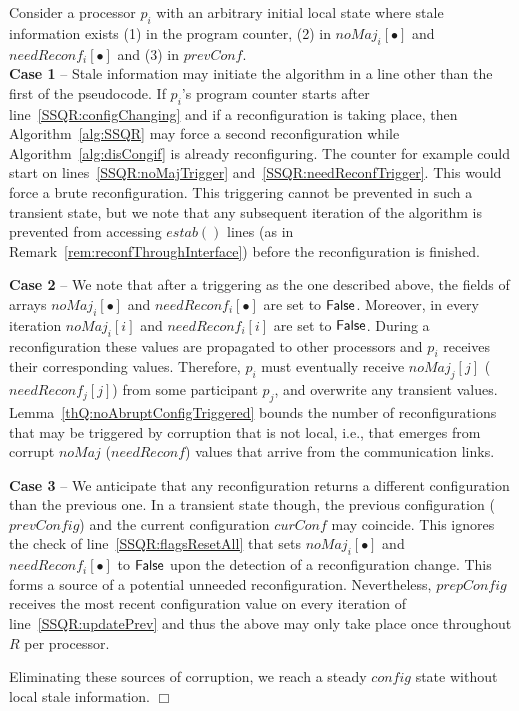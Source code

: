 \documentclass[11pt]{article}
\newcommand{\configEstab}{estab}
\newenvironment{proof}{\noindent{\bf Proof.}}{\hfill$\Box$}
\begin{document}
\begin{proof}
Consider a processor $p_i$ with an arbitrary initial local state where stale information exists  (1) in the program counter, (2) in $noMaj_i[\bullet]$ and $needReconf_i[\bullet]$ and (3) in $prevConf$. \\
\textbf{Case 1} -- Stale information may initiate the algorithm in a line other than the first of the pseudocode.
If $p_i$'s program counter starts after line~\ref{SSQR:configChanging} and if a reconfiguration is taking place, then Algorithm~\ref{alg:SSQR} may force a second reconfiguration while Algorithm~\ref{alg:disCongif} is already reconfiguring.
The counter for example could start on lines~\ref{SSQR:noMajTrigger} and~\ref{SSQR:needReconfTrigger}.
This would force a brute reconfiguration.
This triggering cannot be prevented in such a transient state, but we note that any subsequent iteration of the algorithm is prevented from accessing $\configEstab()$ lines (as in  Remark~\ref{rem:reconfThroughInterface}) before the reconfiguration is finished.



\noindent\textbf{Case 2} -- We note that after a triggering as the one described above, the fields of arrays $noMaj_i[\bullet]$ and $needReconf_i[\bullet]$ are set to $\sf False$. 
Moreover, in every iteration $noMaj_i[i]$ and $needReconf_i[i]$ are set to $\sf False$.
During a reconfiguration these values are propagated to other processors and $p_i$ receives their corresponding values.
Therefore, $p_i$ must eventually receive $noMaj_j[j]$ ($needReconf_j[j]$) from some participant $p_j$, and overwrite any transient values.
Lemma~\ref{thQ:noAbruptConfigTriggered} bounds the number of reconfigurations that may be triggered by corruption that is not local, i.e., that emerges from corrupt $noMaj$ ($needReconf$) values that arrive from the communication links.

\noindent\textbf{Case 3} -- We anticipate that any reconfiguration returns a different configuration than the previous one.
In a transient state though, the previous configuration ($prevConfig$) and the current configuration $curConf$ may coincide.
This ignores the check of line~\ref{SSQR:flagsResetAll} that sets $noMaj_i[\bullet]$ and $needReconf_i[\bullet]$ to $\sf False$ upon the detection of a reconfiguration change. 
This forms a source of a potential unneeded reconfiguration.
Nevertheless, $prepConfig$ receives the most recent configuration value on every iteration of line~\ref{SSQR:updatePrev} and thus the above may only take place once throughout $R$ per processor.

\noindent Eliminating these sources of corruption, we reach a steady $config$ state without local stale information.
\end{proof}
\vspace{.5em}
\end{document}
